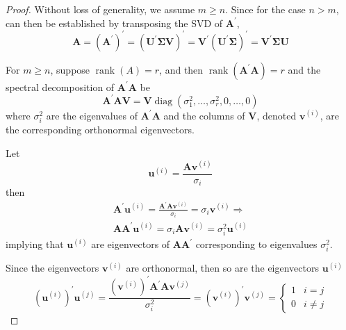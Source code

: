 \begin{proof}
    Without loss of generality, we assume $m\geq n$. Since for the case $n>m$, can then be established by transposing the SVD of $\mathbf{A}^{\prime}$,
    \begin{equation*}
        \mathbf{A}=\left(\mathbf{A}^{\prime}\right)^{\prime}=\left(\mathbf{U}^{\prime}\boldsymbol{\Sigma}\mathbf{V}\right)^{\prime}=\mathbf{V}^{\prime}\left(\mathbf{U}^{\prime}\boldsymbol{\Sigma}\right)^{\prime}=\mathbf{V}^{\prime}\boldsymbol{\Sigma}\mathbf{U}
    \end{equation*}

    For $m\geq n$, suppose $\operatorname{rank}(A)=r$, and then $\operatorname{rank}\left(\mathbf{A}^{\prime}\mathbf{A}\right)=r$ and the spectral decomposition of $\mathbf{A}^{\prime}\mathbf{A}$ be
    \begin{equation*}
        \mathbf{A}^{\prime}\mathbf{A}\mathbf{V}=\mathbf{V}\operatorname{diag}\left(\sigma_{1}^{2},\ldots,\sigma_{r}^{2},0,\ldots,0\right)
    \end{equation*}
    where $\sigma_{i}^{2}$ are the eigenvalues of $\mathbf{A}^{\prime}\mathbf{A}$ and the columns of $\mathbf{V}$, denoted $\boldsymbol{v}^{(i)}$, are the corresponding orthonormal eigenvectors.

    Let
    \begin{equation*}
        \boldsymbol{u}^{(i)}=\frac{\mathbf{A}\boldsymbol{v}^{(i)}}{\sigma_{i}}
    \end{equation*}
    then
    \begin{gather*}
        \mathbf{A}^{\prime}\boldsymbol{u}^{(i)}=\frac{\mathbf{A}^{\prime}\mathbf{A}\boldsymbol{v}^{(i)}}{\sigma_{i}}=\sigma_{i}\boldsymbol{v}^{(i)}\Rightarrow                       \\
        \mathbf{A}\mathbf{A}^{\prime}\boldsymbol{u}^{(i)}=\sigma_{i}\mathbf{A}\boldsymbol{v}^{(i)}=\sigma_{i}^{2}\boldsymbol{u}^{(i)}
    \end{gather*}
    implying that $\boldsymbol{u}^{(i)}$ are eigenvectors of $\mathbf{A}\mathbf{A}^{\prime}$ corresponding to eigenvalues $\sigma_{i}^{2}$.

    Since the eigenvectors $\boldsymbol{v}^{(i)}$ are orthonormal, then so are the eigenvectors $\boldsymbol{u}^{(i)}$
    \begin{equation*}
        \left(\boldsymbol{u}^{(i)}\right)^{\prime}\boldsymbol{u}^{(j)}=\frac{\left(\boldsymbol{v}^{(i)}\right)^{\prime}\mathbf{A}^{\prime}\mathbf{A}\boldsymbol{v}^{(j)}}{\sigma_{i}^{2}}=\left(\boldsymbol{v}^{(i)}\right)^{\prime}\boldsymbol{v}^{(j)}=\begin{cases}1 & i=j \\ 0 & i \neq j\end{cases}
    \end{equation*}


\end{proof}
